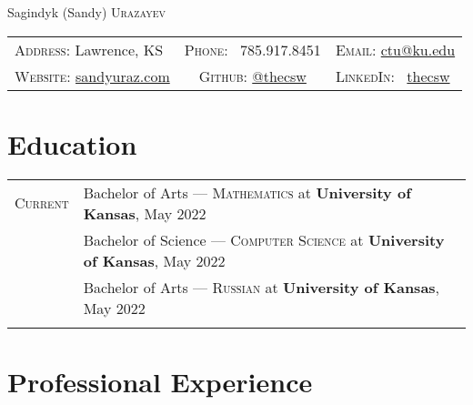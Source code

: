 \documentclass[a4paper, 10pt]{article}
\begin{document}
\pagestyle{empty}
\enlargethispage{\baselineskip}

\par{\centering
	{\Huge Sagindyk (Sandy) \textsc{Urazayev}
	}\smallskip\par}

\begin{center}
	\begin{tabular}{lcl}
		\textsc{Address:}   Lawrence, KS                                 &
		\textsc{Phone:} \quad \ 785.917.8451                             &
		\textsc{Email:} \quad \href{mailto:ctu@ku.edu}{ctu@ku.edu}         \\

		\textsc{Website:} \href{https://sandyuraz.com}{sandyuraz.com}    &
		\textsc{Github:} \quad \href{https://github.com/thecsw}{@thecsw} &
		\textsc{LinkedIn:} \ \href{https://linkedin.com/in/thecsw}{thecsw} \\
	\end{tabular}
\end{center}

\section{Education}

\begin{tabular}{rl}
	\textsc{Current} & Bachelor of Arts --- \textsc{Mathematics} at \normalsize\textbf{University of Kansas}, May 2022         \\
	                 & Bachelor of Science --- \textsc{Computer Science} at \normalsize\textbf{University of Kansas}, May 2022 \\
	                 & Bachelor of Arts --- \textsc{Russian} at \normalsize\textbf{University of Kansas}, May 2022             \\

	\\
\end{tabular}

\section{Professional Experience}
\end{document}
